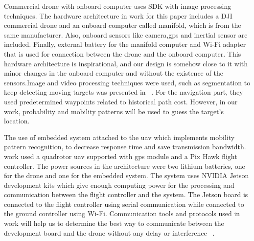 \documentclass[../main.tex]{subfiles}
\begin{document}

	Commercial drone with onboard computer uses SDK with image processing techniques.
	The hardware architecture in \citeauthor{Wang18} work for this paper includes a DJI 
	commercial drone and an onboard computer called manifold, which is from the same manufacturer.
	 Also, onboard sensors like camera,\gls{gps} and inertial sensor are included. Finally,
	 external battery for the manifold computer and Wi-Fi adapter that is used for connection 
	 between the drone and the onboard computer. This hardware architecture is inspirational, and our design is somehow close to it with minor changes in the onboard computer and 
	 without the existence of the sensors.Image and video processing techniques were used, such as 
	 segmentation to keep detecting moving targets was presented in ~\cite{Wang18}.
	For the navigation part, they used predetermined waypoints related to historical path cost. 
	However, in our work, probability and mobility patterns will be used to guess the target's location.

    The use of embedded system attached to the \gls{uav} which implements mobility pattern recognition, to decrease response time and save transmission bandwidth. 
	\citeauthor{Zhao18} work used a quadrotor \gls{uav} supported with \gls{gps} module and a Pix 
	Hawk flight controller. The power sources in the architecture were two lithium batteries, 
	one for the drone and one for the embedded system. The system uses NVIDIA Jetson development
	 kits which give enough computing power for the processing and communication between the flight 
	 controller and the system. The Jetson board is connected to the flight controller using serial 
	 communication while connected to the ground controller using Wi-Fi. Communication tools and protocols used in \citeauthor{Zhao18} work will help us to determine the best way to communicate between the development board and the drone without any delay or interference ~\cite{Zhao18}. 



\end{document}
